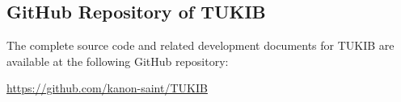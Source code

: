 %
%
%                 

\chapter{}
\label{sec:appendixa}

\section{GitHub Repository of TUKIB}

The complete source code and related development documents for TUKIB are available at the following GitHub repository:

\url{https://github.com/kanon-saint/TUKIB}

%

